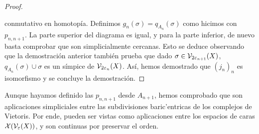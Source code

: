 \begin{proof}
\begin{center}
\begin{tikzcd}
 \end{tikzcd}
\end{center} 
conmutativo en homotopía. Definimos $ g_n (\sigma)= q_{A_n}(\sigma) $ como hicimos con $p_{n,n+1} $. La parte superior del diagrama es igual, y para la parte inferior, de nuevo basta comprobar que son simplicialmente cercanas. Esto se deduce observando que la demostración anterior también prueba que dado $ \sigma \in \vcal_{2\eps_{n+1}}(X ) $, $ q_{A_n}(\sigma)\cup \sigma  $ es un símpice de $ \vcal_{2\eps_n}(X ) $. Así, hemos demostrado que $ (j_n )_n $ es isomorfismo y se concluye la demostración.
\end{proof}

Aunque hayamos definido las $ p_{n,n+1} $ desde $ A_{n+1 } $, hemos comprobado que son aplicaciones simpliciales entre las subdivisiones baric'entricas de los complejos de Vietoris. Por ende, pueden ser vistas como aplicaciones entre los espacios de caras $\xcal (\vcal_\eps(X))$, y son continuas por preservar el orden. 

